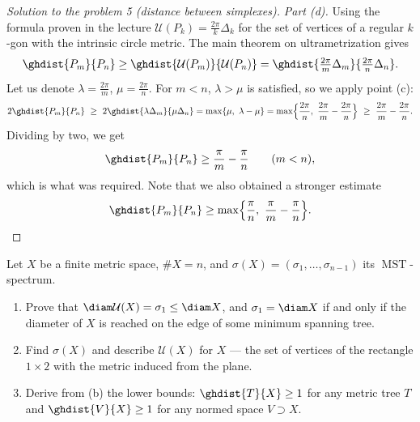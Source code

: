\documentclass[a4paper,12pt]{report}
\begin{document}
\begin{proof}[Solution to the problem \textup{5} \textup{(}distance between simplexes\textup{)}]
\textit{Part \textup{(d)}.} Using the formula proven in the lecture $\mathcal U(P_k)=\frac{2\pi}{k}\Delta_k$ for the set of vertices of a regular $k$-gon with the intrinsic circle metric. The main theorem on ultrametrization gives
\[
\ghdist{P_m}{P_n}\ge\ghdist{\mathcal U(P_m)}{\mathcal U(P_n)}=\ghdist{\tfrac{2\pi}{m}\Delta_m}{\tfrac{2\pi}{n}\Delta_n} .
\]
Let us denote $\lambda=\frac{2\pi}{m}$, $\mu=\frac{2\pi}{n}$. For $m<n$, $\lambda>\mu$ is satisfied, so we apply point \textup{(c)}\textup{:}
\[
2\ghdist{P_m}{P_n}\ \ge\ 2\ghdist{\lambda\Delta_m}{\mu\Delta_n}=\max\{\mu,\ \lambda-\mu\}
=\max\Bigl\{\frac{2\pi}{n},\ \frac{2\pi}{m}-\frac{2\pi}{n}\Bigr\}\ \ge\ \frac{2\pi}{m}-\frac{2\pi}{n} .
\]
Dividing by two, we get
\[
\ghdist{P_m}{P_n}\ge\frac{\pi}{m}-\frac{\pi}{n}\qquad(m<n),
\]
which is what was required. Note that we also obtained a stronger estimate
\[
\ghdist{P_m}{P_n}\ge\max\Bigl\{\frac{\pi}{n},\ \frac{\pi}{m}-\frac{\pi}{n}\Bigr\} .
\]

\end{proof}
\begin{task}
Let $X$ be a finite metric space, $\#X=n$, and $\sigma(X)=(\sigma_1,\dots,\sigma_{n-1})$ its $\operatorname{MST}$-spectrum.
\begin{enumerate}[label=\textup{(\alph*)}]
\item Prove that $\diam\mathcal U(X)=\sigma_1\le\diam X$, and $\sigma_1=\diam X$ if and only if the diameter of $X$ is reached on the edge of some minimum spanning tree.
\item Find $\sigma(X)$ and describe $\mathcal U(X)$ for $X$ --- the set of vertices of the rectangle $1\times 2$ with the metric induced from the plane.
\item Derive from \textup{(b)} the lower bounds\textup{:} $\ghdist{T}{X}\ge 1$ for any metric tree $T$ and $\ghdist{V}{X}\ge 1$ for any normed space $V\supset X$.
\end{enumerate}

\end{task}
\end{document}
